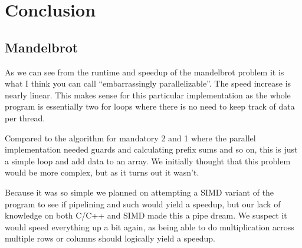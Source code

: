 \documentclass[12pt,a4paper,oneside,article]{memoir}
\numberwithin{equation}{chapter}
\begin{document}
\chapter{Conclusion} %
\label{cha:Conclusion}

\section{Mandelbrot} %
\label{sec:Mandelbrot}

As we can see from the runtime and speedup of the mandelbrot problem it is what 
I think you can call ``embarrassingly parallelizable''. The speed increase is nearly
linear. This makes sense for this particular implementation as the whole program is
essentially two for loops where there is no need to keep track of data per thread. 

Compared to the algorithm for mandatory 2 and 1 where the parallel implementation needed
guards and calculating prefix sums and so on, this is just a simple loop and add 
data to an array. We initially thought that this problem would be more complex, but 
as it turns out it wasn't. 

Because it was so simple we planned on attempting a SIMD variant of the program
to see if pipelining and such would yield a speedup, but our lack of knowledge 
on both C/C++ and SIMD made this a pipe dream. We suspect it would speed everything
up a bit again, as being able to do multiplication across multiple rows or columns
should logically yield a speedup.

\end{document}
